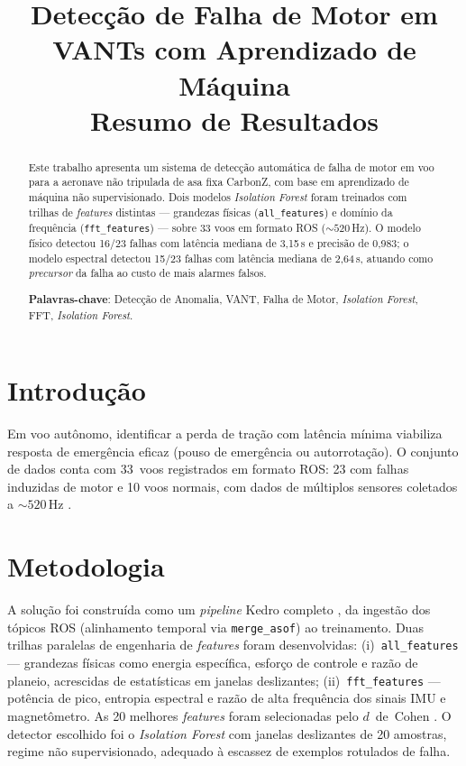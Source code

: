 \documentclass[12pt, a4paper]{article}
\begin{document}
\title{\textbf{Detecção de Falha de Motor em VANTs com Aprendizado de Máquina}\\[4pt]
       \large Resumo de Resultados}
\author{}
\date{}
\maketitle
\thispagestyle{empty}
\vspace{-10pt}

\begin{abstract}
\noindent
Este trabalho apresenta um sistema de detecção automática de falha de motor em voo para a aeronave não tripulada de asa fixa CarbonZ, com base em aprendizado de máquina não supervisionado. Dois modelos \textit{Isolation Forest} foram treinados com trilhas de \textit{features} distintas --- grandezas físicas (\texttt{all\_features}) e domínio da frequência (\texttt{fft\_features}) --- sobre 33 voos em formato ROS (${\sim}520$\,Hz). O modelo físico detectou 16/23 falhas com latência mediana de 3,15\,s e precisão de 0,983; o modelo espectral detectou 15/23 falhas com latência mediana de 2,64\,s, atuando como \textit{precursor} da falha ao custo de mais alarmes falsos.

\smallskip
\noindent\textbf{Palavras-chave}: Detecção de Anomalia, VANT, Falha de Motor, \textit{Isolation Forest}, FFT, \textit{Isolation Forest}.
\end{abstract}

\section{Introdução}

Em voo autônomo, identificar a perda de tração com latência mínima viabiliza resposta de emergência eficaz (pouso de emergência ou autorrotação). O conjunto de dados conta com 33~voos registrados em formato ROS: 23 com falhas induzidas de motor e 10 voos normais, com dados de múltiplos sensores coletados a ${\sim}520$\,Hz \cite{keipour2019automatic}.

\section{Metodologia}

A solução foi construída como um \textit{pipeline} Kedro completo \cite{kedro2020}, da ingestão dos tópicos ROS (alinhamento temporal via \texttt{merge\_asof}) ao treinamento. Duas trilhas paralelas de engenharia de \textit{features} foram desenvolvidas: (i)~\texttt{all\_features} --- grandezas físicas como energia específica, esforço de controle e razão de planeio, acrescidas de estatísticas em janelas deslizantes; (ii)~\texttt{fft\_features} --- potência de pico, entropia espectral e razão de alta frequência dos sinais IMU e magnetômetro. As 20 melhores \textit{features} foram selecionadas pelo $d$~de~Cohen \cite{cohen1988statistical}. O detector escolhido foi o \textit{Isolation Forest} \cite{liu2008isolation} com janelas deslizantes de 20 amostras, regime não supervisionado, adequado à escassez de exemplos rotulados de falha.
\end{document}
